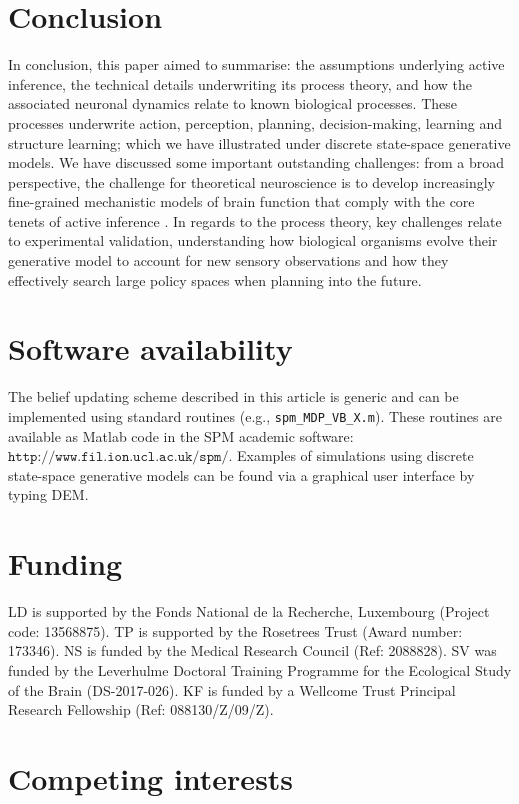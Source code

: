 \documentclass[review,12pt,authoryear]{elsarticle}
\begin{document}
\section{Conclusion}

In conclusion, this paper aimed to summarise: the assumptions underlying active inference, the technical details underwriting its process theory, and how the associated neuronal dynamics relate to known biological processes. These processes underwrite action, perception, planning, decision-making, learning and structure learning; which we have illustrated under discrete state-space generative models. We have discussed some important outstanding challenges: from a broad perspective, the challenge for theoretical neuroscience is to develop increasingly fine-grained mechanistic models of brain function that comply with the core tenets of active inference \citep{parrMarkovBlanketsInformation2019,fristonFreeEnergyPrinciple2019}. In regards to the process theory, key challenges relate to experimental validation, understanding how biological organisms evolve their generative model to account for new sensory observations and how they effectively search large policy spaces when planning into the future.

\section*{Software availability}
The belief updating scheme described in this article is generic and can be implemented using standard routines (e.g., \texttt{spm\_MDP\_VB\_X.m}). These routines are available as Matlab code in the SPM academic software: $\texttt{http://www.fil.ion.ucl.ac.uk/spm/}$. Examples of simulations using discrete state-space generative models can be found via a graphical user interface by typing DEM.

\section*{Funding}

LD is supported by the Fonds National de la Recherche, Luxembourg (Project code: 13568875). TP is supported by the Rosetrees Trust (Award number: 173346). NS is funded by the Medical Research Council (Ref: 2088828). SV was funded by the Leverhulme Doctoral Training Programme for the Ecological Study of the Brain (DS-2017-026). KF is funded by a Wellcome Trust Principal Research Fellowship (Ref: 088130/Z/09/Z).

\section*{Competing interests}
\end{document}
